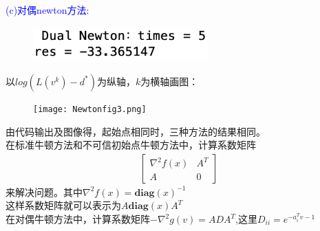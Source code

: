 \documentclass{article}
\begin{document}
\textcolor{blue}{(c)对偶newton方法:}\\

\begin{figure}[H] 
    \centering 
    \includegraphics[width=0.6\textwidth]{Newtonres3.png}
\end{figure}
以$log(L(v^k) - d^*)$为纵轴，$k$为横轴画图：
\begin{figure}[H] 
    \centering 
    \texttt{[image: Newtonfig3.png]}
\end{figure}
由代码输出及图像得，起始点相同时，三种方法的结果相同。\\
在标准牛顿方法和不可信初始点牛顿方法中，计算系数矩阵
$$
\begin{gathered}
    \left[
        \begin{array}{cccc}
            \nabla ^2f(x) & A^T \\
            A & 0
        \end{array} 
    \right]
\end{gathered}
$$
来解决问题。其中$\nabla ^2f(x) = \textbf{diag}(x)^{-1}$\\ 

这样系数矩阵就可以表示为$A\textbf{diag}(x)A^T$\\

在对偶牛顿方法中，计算系数矩阵$-\nabla ^2 g(v) = ADA^T$,这里$D_{ii} = e^{-a^T_i v - 1}$\\
\end{document}
